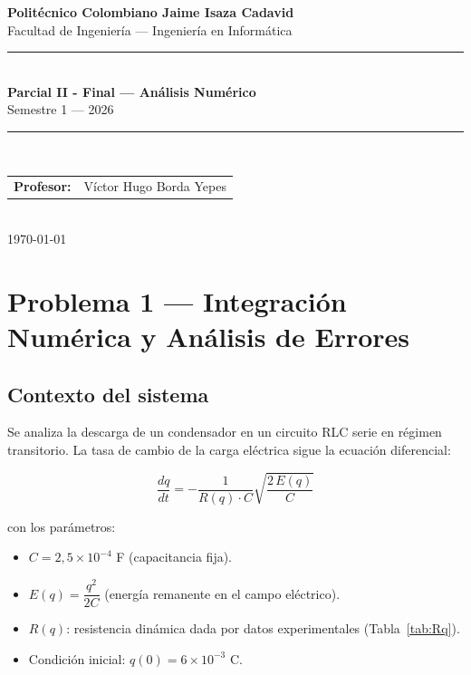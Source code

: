 \documentclass[12pt,a4paper]{article}
\begin{document}
\begin{titlepage}
    \centering
    \vspace*{1.5cm}
    {\Large \textbf{Politécnico Colombiano Jaime Isaza Cadavid}}\\[0.4cm]
    {\large Facultad de Ingeniería --- Ingeniería en Informática}\\[0.4cm]
    \rule{\linewidth}{0.5pt}\\[0.8cm]
    {\LARGE \textbf{Parcial II - Final --- Análisis Numérico}}\\[0.3cm]
    {\large Semestre 1 --- 2026}\\[0.8cm]
    \rule{\linewidth}{0.5pt}\\[1cm]
    \begin{tabular}{ll}
        \textbf{Profesor:} & Víctor Hugo Borda Yepes \\[0.3cm]
    \end{tabular}\\[3cm]
    \vfill
    {\large \today}
\end{titlepage}
\newpage

\section{Problema 1 --- Integración Numérica y Análisis de Errores}

\subsection{Contexto del sistema}

Se analiza la descarga de un condensador en un circuito RLC serie en régimen
transitorio. La tasa de cambio de la carga eléctrica sigue la ecuación
diferencial:

\begin{equation}
    \frac{dq}{dt} = -\frac{1}{R(q)\cdot C} \sqrt{\frac{2\,E(q)}{C}}
    \label{eq:ode}
\end{equation}

\noindent con los parámetros:
\begin{itemize}
    \item $C = 2{,}5 \times 10^{-4}$ F (capacitancia fija).
    \item $E(q) = \dfrac{q^2}{2C}$ (energía remanente en el campo eléctrico).
    \item $R(q)$: resistencia dinámica dada por datos experimentales (Tabla~\ref{tab:Rq}).
    \item Condición inicial: $q(0) = 6 \times 10^{-3}$ C.
\end{itemize}
\end{document}

